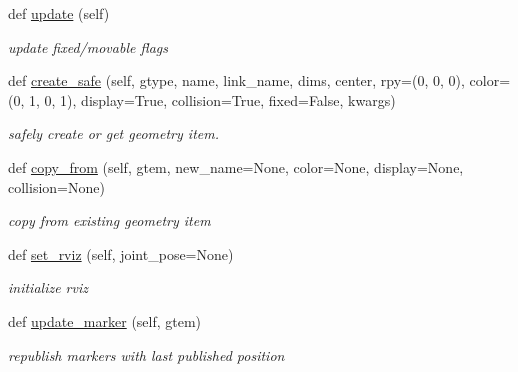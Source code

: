 \begin{DoxyCompactItemize}
def \hyperlink{classrnb-planning_1_1src_1_1pkg_1_1geometry_1_1geometry_1_1_geometry_scene_a392262f847260b217fa820f7c4f5a3e2}{update} (self)
\begin{DoxyCompactList}\small\item\em update fixed/movable flags \end{DoxyCompactList}\item 
def \hyperlink{classrnb-planning_1_1src_1_1pkg_1_1geometry_1_1geometry_1_1_geometry_scene_a2edb3fce34a51cf6712e588502e23be2}{create\+\_\+safe} (self, gtype, name, link\+\_\+name, dims, center, rpy=(0, 0, 0), color=(0, 1, 0, 1), display=True, collision=True, fixed=False, kwargs)
\begin{DoxyCompactList}\small\item\em safely create or get geometry item. \end{DoxyCompactList}\item 
def \hyperlink{classrnb-planning_1_1src_1_1pkg_1_1geometry_1_1geometry_1_1_geometry_scene_a0dadb901716af9bf4594b2f03caac48c}{copy\+\_\+from} (self, gtem, new\+\_\+name=None, color=None, display=None, collision=None)
\begin{DoxyCompactList}\small\item\em copy from existing geometry item \end{DoxyCompactList}\item 
\mbox{\label{classrnb-planning_1_1src_1_1pkg_1_1geometry_1_1geometry_1_1_geometry_scene_a569d3193969d1124caa8d628ea5a0cc7}} 
def \hyperlink{classrnb-planning_1_1src_1_1pkg_1_1geometry_1_1geometry_1_1_geometry_scene_a569d3193969d1124caa8d628ea5a0cc7}{set\+\_\+rviz} (self, joint\+\_\+pose=None)
\begin{DoxyCompactList}\small\item\em initialize rviz \end{DoxyCompactList}\item 
\mbox{\label{classrnb-planning_1_1src_1_1pkg_1_1geometry_1_1geometry_1_1_geometry_scene_af1e190a4e2b7c680f74baefb634b92b7}} 
def \hyperlink{classrnb-planning_1_1src_1_1pkg_1_1geometry_1_1geometry_1_1_geometry_scene_af1e190a4e2b7c680f74baefb634b92b7}{update\+\_\+marker} (self, gtem)
\begin{DoxyCompactList}\small\item\em republish markers with last published position \end{DoxyCompactList}\item 

\end{DoxyCompactItemize}
